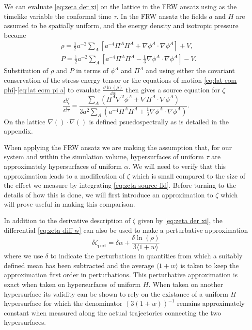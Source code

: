 We can evaluate \eqref{eq:zeta der xi} on the lattice in the FRW ansatz using as the timelike variable the conformal time $\tau$. In the FRW ansatz the fields $a$ and $H$ are assumed to be spatially uniform, and the energy density and isotropic pressure become
\begin{align}
  & \rho = \frac{1}{2}a^{-2}\sum_A\left[a^{-4}\Pi^A\Pi^A + \nabla\phi^A\cdot\nabla\phi^A \right] + V, \label{eq:rho frw}\\
  & P = \frac{1}{2}a^{-2}\sum_A\left[a^{-4}\Pi^A\Pi^A - \frac{1}{3}\nabla\phi^A\cdot\nabla\phi^A \right] - V.
\end{align}
Substitution of $\rho$ and $P$ in terms of $\phi^A$ and $\Pi^A$ and using either the covariant conservation of the stress-energy tensor or the equations of motion \eqref{eq:lat eom phi}-\eqref{eq:lat eom pi a} to evaulate $\frac{\dd\ln(\rho)}{\dd\alpha}$ then gives a source equation for $\zeta$
\begin{equation}
  \frac{\dd\zeta}{\dd\tau} = \frac{\sum_A\left(\Pi^A\nabla^2\phi^A + \nabla\Pi^A\cdot\nabla\phi^A\right)}{3a^2\sum_A\left(a^{-4}\Pi^A\Pi^A + \frac{1}{3}\nabla\phi^A\cdot\nabla\phi^A \right)}. \label{eq:zeta source fld}
\end{equation}
On the lattice $\nabla()\cdot\nabla()$ is defined psuedospectrally as is detailed in the appendix.%

When applying the FRW ansatz we are making the assumption that, for our system and within the simulation volume, hypersurfaces of uniform $\tau$ are approximately hypersurfaces of uniform $\alpha$. We will need to verify that this approximation leads to a modification of $\zeta$ which is small compared to the size of the effect we measure by integrating \eqref{eq:zeta source fld}. Before turning to the details of how this is done, we will first introduce an approximation to $\zeta$ which will prove useful in making this comparison. 

In addition to the derivative description of $\zeta$ given by \eqref{eq:zeta der xi}, the differential \eqref{eq:zeta diff w} can also be used to make a perturbative approximation 
\begin{equation}
  \delta\zeta_\mathrm{pert} = \delta\alpha + \frac{\delta\ln(\rho)}{3\langle 1+w \rangle} \label{eq:zeta pert w}
\end{equation}
where we use $\delta$ to indicate the perturbations in quantities from which a suitably defined mean has been subtracted and the average $\langle 1+w \rangle$ is taken to keep the approximation first order in perturbations. This perturbative approximation is exact when taken on hypersurfaces of uniform $H$. When taken on another hypersurface its validity can be shown to rely on the existance of a uniform $H$ hypersurface for which the denominator $(3(1+w))^{-1}$ remains approximately constant when measured along the actual trajectories connecting the two hypersurfaces.

